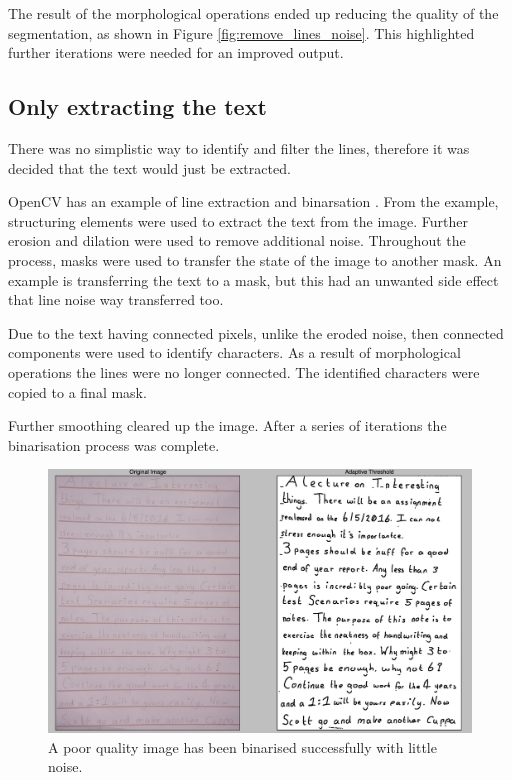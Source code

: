 The result of the morphological operations ended up reducing the quality of the segmentation, as shown in Figure \ref{fig:remove_lines_noise}. This highlighted further iterations were needed for an improved output.

\subsection{Only extracting the text}
There was no simplistic way to identify and filter the lines, therefore it was decided that the text would just be extracted.

OpenCV has an example of line extraction and binarsation \cite{citeulike:14006256}. From the example, structuring elements were used to extract the text from the image. Further erosion and dilation were used to remove additional noise. Throughout the process, masks were used to transfer the state of the image to another mask. An example is transferring the text to a mask, but this had an unwanted side effect that line noise way transferred too.

Due to the text having connected pixels, unlike the eroded noise, then connected components were used to identify characters. As a result of  morphological operations the lines were no longer connected. The identified characters were copied to a final mask.

Further smoothing cleared up the image. After a series of iterations the binarisation process was complete.

\begin{figure}[H]
  \centering
  \includegraphics[scale=0.3]{images/hard_image}
  \caption{A poor quality image has been binarised successfully with little noise.}
  \label{fig:poor_quality}
\end{figure}

